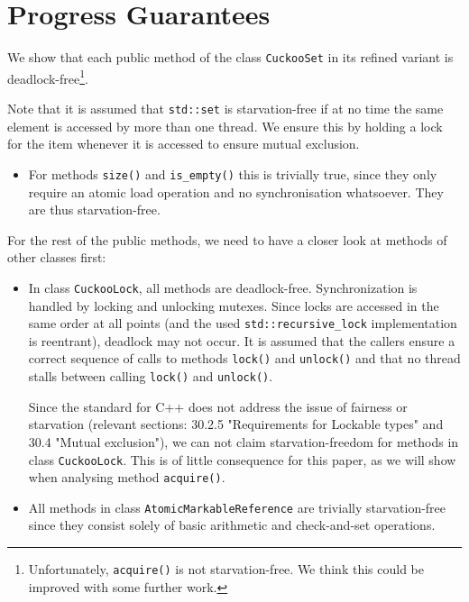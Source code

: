 \documentclass[a4paper,10pt]{article}
\begin{document}
\section{Progress Guarantees}
\label{sec:progressGuarantees}

We show that each public method of the class \lstinline|CuckooSet| in its
refined variant is deadlock-free\footnote{Unfortunately, \lstinline|acquire()|
is not starvation-free. We think this could be improved with some further
work.}.

Note that it is assumed that \lstinline|std::set| is
starvation-free if at no time the same element is accessed by more than one
thread. We ensure this by holding a lock for the item whenever it is accessed
to ensure mutual exclusion.

\begin{itemize}
\item For methods \lstinline|size()| and \lstinline|is_empty()| this is
    trivially true, since they only require an atomic load operation and no
    synchronisation whatsoever. They are thus starvation-free.
\end{itemize}

For the rest of the public methods, we need to have a closer look at methods of
other classes first:

\begin{itemize}
\item In class \lstinline|CuckooLock|, all methods are deadlock-free.
    Synchronization is handled by locking and unlocking mutexes. Since locks
    are accessed in the same order at all points (and the used
    \lstinline|std::recursive_lock| implementation is reentrant), deadlock may
    not occur. It is assumed that the callers ensure a correct sequence of
    calls to methods \lstinline|lock()| and \lstinline|unlock()| and that no
    thread stalls between calling \lstinline|lock()| and \lstinline|unlock()|. 

    Since the standard for C++ \cite{cppstandard} does not address the issue of
    fairness or starvation (relevant sections: 30.2.5 "Requirements for Lockable
    types" and 30.4 "Mutual exclusion"), we can not claim starvation-freedom for
    methods in class \lstinline|CuckooLock|. This is of little consequence for this
    paper, as we will show when analysing method \lstinline|acquire()|.

\item All methods in class \lstinline|AtomicMarkableReference| are trivially
    starvation-free since they consist solely of basic arithmetic and check-and-set
    operations.
\end{itemize}
\end{document}
